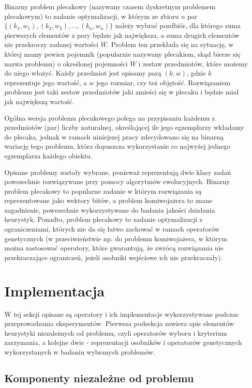 \documentclass[./FM_mgr.tex]{subfiles}
\begin{document}
Binarny problem plecakowy (nazywany czasem dyskretnym problemem plecakowym) to zadanie optymalizacji, w którym ze zbioru $n$ par $\{ (k_1, w_1),  (k_2, w_2), \ldots, (k_n, w_n)\}$ należy wybrać pozdbiór, dla którego suma pierwszych elementów z pary będzie jak największa, a suma drugich elementów nie przekroczy zadanej wartości $W$.
Problem ten przekłada się na sytuację, w której mamy pewien pojemnik (popularnie nazywany plecakiem, skąd bierze się nazwa problemu) o określonej pojemności $W$ i zestaw przedmiotów, które możemy do niego włożyć. 
Każdy przedmiot jest opisamy parą $(k, w)$, gdzie $k$ reprezentuje jego wartość, a $w$ jego rozmiar, czy też objętość. 
Rozwiązaniem problemu jest taki zestaw przedmiotów jaki zmieści się w plecaku i będzie miał jak największą wartość. 

Ogólna wersja problemu plecakowego polega na przypisaniu każdemu z przedmiotów (par) liczby naturalnej, określającej ile jego egzemplarzy wkładamy do plecaka, jednak w ramach niniejszej pracy zdecydowano się na binarną wariację tego problemu, która dopuszcza wykorzystanie co najwyżej jednego egzemplarza każdego obiektu.

Opisane problemy zostały wybrane, ponieważ reprezentują dwie klasy zadań powszechnie rozwiązywane przy pomocy algorytmów ewolucyjnych. 
Binarny problem plecakowy to popularne zadanie w którym rozwiązania są reprezentowane jako wektory bitów, a problem komiwojażera to znane zagadnienie, powszechnie wykorzystywane do badania jakości działania heurystyk. 
Ponadto, problem plecakowy to zadanie optymalizacji z ograniczeniami, których nie da się łatwo zachować w ramach operatorów genetycznych (w przeciwieństwie np. do problemu komiwojażera, w którym można zastosować operatory, które gwarantują, że zwrócą rozwiązania nie przekraczające ograniczeń, jeżeli osobniki wejściowe ich nie przekraczały).

\section{Implementacja}

W tej sekcji opisane są operatory i ich implementacje wykorzystywane podczas przeprowadzania eksperymentów. 
Pierwsza podsekcja zawiera opis elementów heurystyki niezależnych od problemu, czyli operatorów wyboru i kryterium zarzymania, a kolejne dwie - reprezentacji osobników i operatorów genetycznych wykorzystanych w badaniu wybranych problemów.

\subsection{Komponenty niezależne od problemu} \label{subsection:independent_impl}
\end{document}
